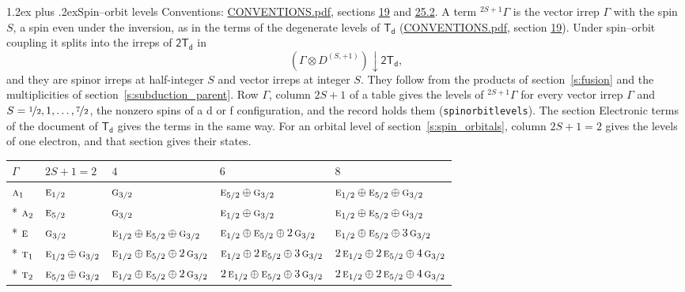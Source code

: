 \documentclass[10pt,a4paper]{article}
\makeatletter
\renewcommand\section{\@startsection{section}{1}{\z@}{-3ex plus -1ex minus -.2ex}%
  {1.2ex plus .2ex}{\normalfont\large\sffamily\bfseries\color{parttitle}}}
\numberwithin{equation}{section}
\newcommand{\grp}[1]{\mathsf{#1}}
\newcommand{\irr}[1]{\text{\normalfont\scshape #1}}
\newcommand{\restr}[2]{#1\!\downarrow#2}
\newcommand{\irrJp}[2]{D^{(#1,#2)}}
\newcommand{\irrprod}{\otimes}
\newcommand{\term}[2]{{}^{#1}#2}
\makeatother
\begin{document}
\section{Spin--orbit levels}\label{s:spin_orbit}
Conventions: \href{../../CONVENTIONS.pdf}{CONVENTIONS.pdf}, sections \href{../../../rotation/CONVENTIONS.pdf\#conv.19}{19} and \href{../../CONVENTIONS.pdf\#conv.25.2}{25.2}.
\leavevmode\label{n:local.spin}\label{n:symbol.term}A term $\term{2S+1}{\Gamma}$ is the vector irrep $\Gamma$ with the spin $S$, a spin even under the inversion, as in the terms of the degenerate levels of \href{../../../rotation/data/pdf/Td.pdf}{$\grp{T_{d}}$} (\href{../../CONVENTIONS.pdf}{CONVENTIONS.pdf}, section \href{../../../rotation/CONVENTIONS.pdf\#conv.19}{19}). Under spin--orbit coupling it splits into the irreps of $\grp{2T_{d}}$ in
\begin{equation}\label{e:spinorbit}\restr{(\Gamma \irrprod \irrJp{S}{+1})}{\grp{2T_{d}}},\end{equation}
and they are spinor irreps at half-integer $S$ and vector irreps at integer $S$. They follow from the products of section~\ref{s:fusion} and the multiplicities of section~\ref{s:subduction_parent}. Row $\Gamma$, column $2S + 1$ of a table gives the levels of $\term{2S+1}{\Gamma}$ for every vector irrep $\Gamma$ and $S = \nicefrac{1}{2}, 1, \dots, \nicefrac{7}{2}$, the nonzero spins of a d or f configuration, and the record holds them (\texttt{spinorbitlevels}). The section Electronic terms of the document of \href{../../../rotation/data/pdf/Td.pdf}{$\grp{T_{d}}$} gives the terms in the same way. For an orbital level of section~\ref{s:spin_orbitals}, column $2S + 1 = 2$ gives the levels of one electron, and that section gives their states.
{\small\setlength{\tabcolsep}{3pt}\begin{longtable}{@{}lllll@{}}\toprule
$\Gamma$ & $2S + 1 = 2$ & $4$ & $6$ & $8$\\\midrule\endhead
\bottomrule\endfoot\endlastfoot
$\irr{a}_{1}$ & $\irr{e}_{1/2}$ & $\irr{g}_{3/2}$ & $\irr{e}_{5/2}\oplus \irr{g}_{3/2}$ & $\irr{e}_{1/2}\oplus \irr{e}_{5/2}\oplus \irr{g}_{3/2}$\\*
$\irr{a}_{2}$ & $\irr{e}_{5/2}$ & $\irr{g}_{3/2}$ & $\irr{e}_{1/2}\oplus \irr{g}_{3/2}$ & $\irr{e}_{1/2}\oplus \irr{e}_{5/2}\oplus \irr{g}_{3/2}$\\*
$\irr{e}$ & $\irr{g}_{3/2}$ & $\irr{e}_{1/2}\oplus \irr{e}_{5/2}\oplus \irr{g}_{3/2}$ & $\irr{e}_{1/2}\oplus \irr{e}_{5/2}\oplus 2\,\irr{g}_{3/2}$ & $\irr{e}_{1/2}\oplus \irr{e}_{5/2}\oplus 3\,\irr{g}_{3/2}$\\*
$\irr{t}_{1}$ & $\irr{e}_{1/2}\oplus \irr{g}_{3/2}$ & $\irr{e}_{1/2}\oplus \irr{e}_{5/2}\oplus 2\,\irr{g}_{3/2}$ & $\irr{e}_{1/2}\oplus 2\,\irr{e}_{5/2}\oplus 3\,\irr{g}_{3/2}$ & $2\,\irr{e}_{1/2}\oplus 2\,\irr{e}_{5/2}\oplus 4\,\irr{g}_{3/2}$\\*
$\irr{t}_{2}$ & $\irr{e}_{5/2}\oplus \irr{g}_{3/2}$ & $\irr{e}_{1/2}\oplus \irr{e}_{5/2}\oplus 2\,\irr{g}_{3/2}$ & $2\,\irr{e}_{1/2}\oplus \irr{e}_{5/2}\oplus 3\,\irr{g}_{3/2}$ & $2\,\irr{e}_{1/2}\oplus 2\,\irr{e}_{5/2}\oplus 4\,\irr{g}_{3/2}$\\
\bottomrule\end{longtable}}
\end{document}
